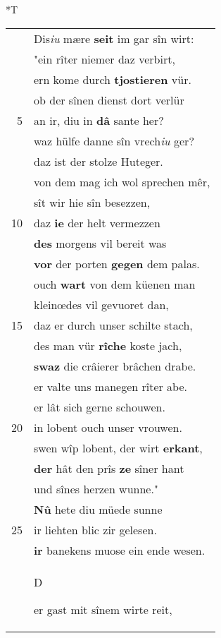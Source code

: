 \documentclass[8pt,a4paper,notitlepage]{article}
\begin{document}
\begin{table}[ht]
\hspace{0.5cm}
\begin{minipage}[t]{0.5\linewidth}
\small
\begin{center}*T
\end{center}
\begin{tabular}{rl}
 & Dis\textit{iu} mære \textbf{seit} im gar sîn wirt:\\ 
 & "ein rîter niemer daz verbirt,\\ 
 & ern kome durch \textbf{tjostieren} vür.\\ 
 & ob der sînen dienst dort verlür\\ 
5 & an ir, diu in \textbf{dâ} sante her?\\ 
 & waz hülfe danne sîn vrech\textit{iu} ger?\\ 
 & daz ist der stolze Huteger.\\ 
 & von dem mag ich wol sprechen mêr,\\ 
 & sît wir hie sîn besezzen,\\ 
10 & daz \textbf{ie} der helt vermezzen\\ 
 & \textbf{des} morgens vil bereit was\\ 
 & \textbf{vor} der porten \textbf{gegen} dem palas.\\ 
 & ouch \textbf{wart} von dem küenen man\\ 
 & kleinœdes vil gevuoret dan,\\ 
15 & daz er durch unser schilte stach,\\ 
 & des man vür \textbf{rîche} koste jach,\\ 
 & \textbf{swaz} die crâierer brâchen drabe.\\ 
 & er valte uns manegen rîter abe.\\ 
 & er lât sich gerne schouwen.\\ 
20 & in lobent ouch unser vrouwen.\\ 
 & swen wîp lobent, der wirt \textbf{erkant},\\ 
 & \textbf{der} hât den prîs \textbf{ze} sîner hant\\ 
 & und sînes herzen wunne."\\ 
 & \textbf{Nû} hete diu müede sunne\\ 
25 & ir liehten blic zir gelesen.\\ 
 & \textbf{ir} banekens muose ein ende wesen.\\ 
 & \begin{large}D\end{large}er gast mit sînem wirte reit,\\ 

\end{tabular}
\end{minipage}
\end{table}
\end{document}
